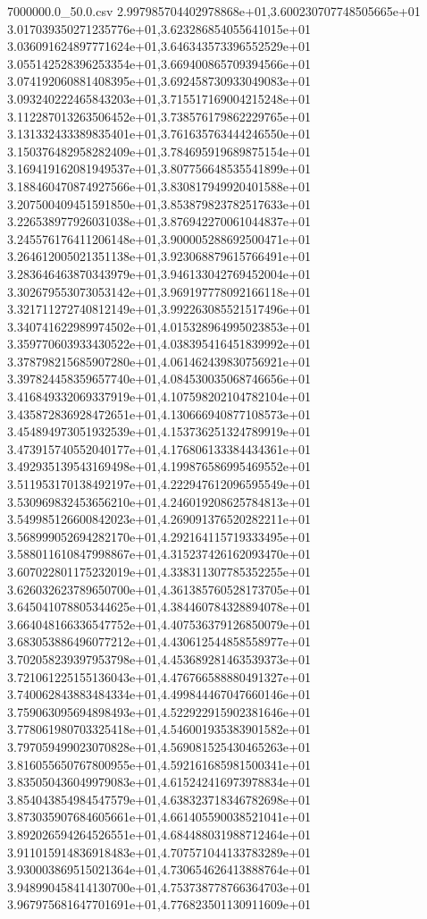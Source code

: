 \begin{filecontents*}{7000000.0_50.0.csv}
2.997985704402978868e+01,3.600230707748505665e+01
3.017039350271235776e+01,3.623286854055641015e+01
3.036091624897771624e+01,3.646343573396552529e+01
3.055142528396253354e+01,3.669400865709394566e+01
3.074192060881408395e+01,3.692458730933049083e+01
3.093240222465843203e+01,3.715517169004215248e+01
3.112287013263506452e+01,3.738576179862229765e+01
3.131332433389835401e+01,3.761635763444246550e+01
3.150376482958282409e+01,3.784695919689875154e+01
3.169419162081949537e+01,3.807756648535541899e+01
3.188460470874927566e+01,3.830817949920401588e+01
3.207500409451591850e+01,3.853879823782517633e+01
3.226538977926031038e+01,3.876942270061044837e+01
3.245576176411206148e+01,3.900005288692500471e+01
3.264612005021351138e+01,3.923068879615766491e+01
3.283646463870343979e+01,3.946133042769452004e+01
3.302679553073053142e+01,3.969197778092166118e+01
3.321711272740812149e+01,3.992263085521517496e+01
3.340741622989974502e+01,4.015328964995023853e+01
3.359770603933430522e+01,4.038395416451839992e+01
3.378798215685907280e+01,4.061462439830756921e+01
3.397824458359657740e+01,4.084530035068746656e+01
3.416849332069337919e+01,4.107598202104782104e+01
3.435872836928472651e+01,4.130666940877108573e+01
3.454894973051932539e+01,4.153736251324789919e+01
3.473915740552040177e+01,4.176806133384434361e+01
3.492935139543169498e+01,4.199876586995469552e+01
3.511953170138492197e+01,4.222947612096595549e+01
3.530969832453656210e+01,4.246019208625784813e+01
3.549985126600842023e+01,4.269091376520282211e+01
3.568999052694282170e+01,4.292164115719333495e+01
3.588011610847998867e+01,4.315237426162093470e+01
3.607022801175232019e+01,4.338311307785352255e+01
3.626032623789650700e+01,4.361385760528173705e+01
3.645041078805344625e+01,4.384460784328894078e+01
3.664048166336547752e+01,4.407536379126850079e+01
3.683053886496077212e+01,4.430612544858558977e+01
3.702058239397953798e+01,4.453689281463539373e+01
3.721061225155136043e+01,4.476766588880491327e+01
3.740062843883484334e+01,4.499844467047660146e+01
3.759063095694898493e+01,4.522922915902381646e+01
3.778061980703325418e+01,4.546001935383901582e+01
3.797059499023070828e+01,4.569081525430465263e+01
3.816055650767800955e+01,4.592161685981500341e+01
3.835050436049979083e+01,4.615242416973978834e+01
3.854043854984547579e+01,4.638323718346782698e+01
3.873035907684605661e+01,4.661405590038521041e+01
3.892026594264526551e+01,4.684488031988712464e+01
3.911015914836918483e+01,4.707571044133783289e+01
3.930003869515021364e+01,4.730654626413888764e+01
3.948990458414130700e+01,4.753738778766364703e+01
3.967975681647701691e+01,4.776823501130911609e+01

\end{filecontents*}
